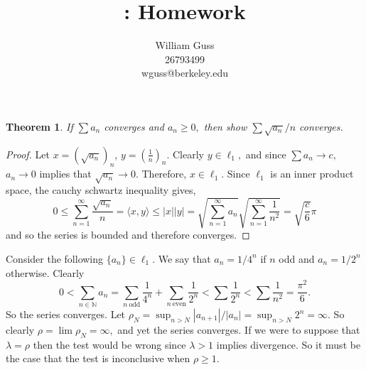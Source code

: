\documentclass[letter]{article}
\title{\bCLASS: Homework \bHWN}
\author{William Guss\\26793499\\wguss@berkeley.edu}
\newtheorem{theorem}{Theorem}
\newenvironment{menumerate}{%
  \edef\backupindent{\the\parindent}%
  \enumerate%
  \setlength{\parindent}{\backupindent}%
}{\endenumerate}
\begin{document}
\maketitle
\thispagestyle{empty}

	\begin{menumerate}
		\setcounter{enumi}{58}
		\item %

		\begin{theorem}
			If $\sum a_n$ converges and $a_n \geq 0,$ then show $\sum \sqrt{a_n}/n$ converges.
		\end{theorem}

		\begin{proof}
			Let $x = (\sqrt{a_n})_n$, $y = \left(\frac{1}{n}\right)_n$. Clearly $y \in \ell_1,$ and since $\sum a_n \to c,$ $a_n \to 0$ implies that $\sqrt{a_n} \to 0.$ Therefore, $x \in \ell_1.$ Since $\ell_1$ is an inner product space, the cauchy schwartz inequality gives, 
			$$0 \leq \sum_{n=1}^\infty \frac{\sqrt{a_n}}{n} = \langle x,y \rangle \leq |x||y| = \sqrt{\sum_{n=1}^\infty a_n} \sqrt{\sum_{n=1}^\infty \frac{1}{n^2}} = \sqrt{\frac{c}{6}}\pi$$
			and so the series is bounded and therefore converges.
		\end{proof}

		\setcounter{enumi}{60}
		\item Consider the following $\{a_n\} \in \ell_1.$ We say that $a_n = 1/4^n$ if $n$ odd and $a_n = 1/2^n$ otherwise. Clearly $$0 < \sum_{n\in\mathbb{N}}a_n = \sum_{n\ \text{odd}} \frac{1}{4^n} + \sum_{n\ \text{even}} \frac{1}{2^n} < \sum \frac{1}{2^n} < \sum \frac{1}{n^2} = \frac{\pi^2}{6}.$$ So the series converges. Let $\rho_N = \sup_{n>N} |a_{n+1}|/|a_n| = \sup_{n>N} 2^n = \infty$. So clearly $\rho = \lim \rho_N = \infty,$ and yet the series converges. If we were to suppose that $\lambda = \rho$ then the test would be wrong since $\lambda > 1$ implies divergence. So it must be the case that the test is inconclusive when $\rho \geq 1.$
		\item %
		\item %


\end{menumerate}
\end{document}
